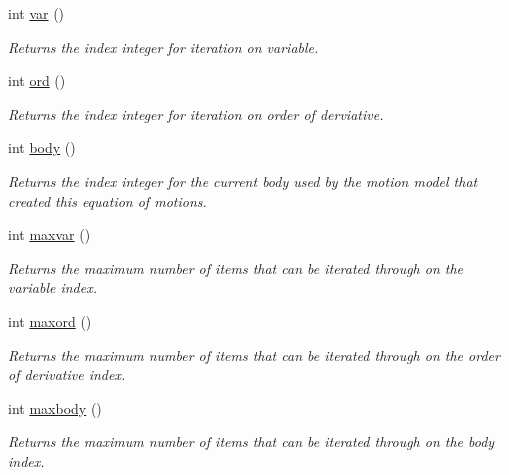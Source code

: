 \begin{DoxyCompactItemize}
int \hyperlink{classosea_1_1ofreq_1_1_equationof_motion_ab69511cc5037376cf7da80ce30d9eaab}{var} ()
\begin{DoxyCompactList}\small\item\em Returns the index integer for iteration on variable. \end{DoxyCompactList}\item 
int \hyperlink{classosea_1_1ofreq_1_1_equationof_motion_a31f904818ce75c9e2a2b5cff9fc707a5}{ord} ()
\begin{DoxyCompactList}\small\item\em Returns the index integer for iteration on order of derviative. \end{DoxyCompactList}\item 
int \hyperlink{classosea_1_1ofreq_1_1_equationof_motion_ac87fe1d5112f5b42f9afd5f1c3b9002c}{body} ()
\begin{DoxyCompactList}\small\item\em Returns the index integer for the current body used by the motion model that created this equation of motions. \end{DoxyCompactList}\item 
int \hyperlink{classosea_1_1ofreq_1_1_equationof_motion_a8c6367e13c8f027f4a0936b821ff9363}{maxvar} ()
\begin{DoxyCompactList}\small\item\em Returns the maximum number of items that can be iterated through on the variable index. \end{DoxyCompactList}\item 
int \hyperlink{classosea_1_1ofreq_1_1_equationof_motion_ad8271e1cc1d78b7bf80a90fe3c3b06b4}{maxord} ()
\begin{DoxyCompactList}\small\item\em Returns the maximum number of items that can be iterated through on the order of derivative index. \end{DoxyCompactList}\item 
int \hyperlink{classosea_1_1ofreq_1_1_equationof_motion_a0fea5098961fce0004b978223b4a501b}{maxbody} ()
\begin{DoxyCompactList}\small\item\em Returns the maximum number of items that can be iterated through on the body index. \end{DoxyCompactList}\end{DoxyCompactItemize}
